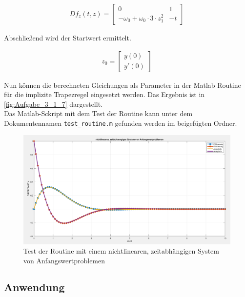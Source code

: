 \documentclass[
	pagesize,
	fontsize=12pt,
	paper=a4,
	oneside,
   reqno
]{scrartcl}
\begin{document}
\begin{align*}
   Df_z(t,z) =
   \begin{bmatrix*}
      0                                            & 1 \\
      -\omega _0 + \omega _0 \cdot 3 \cdot z_1^2  & -t
   \end{bmatrix*}
\end{align*}

Abschließend wird der Startwert ermittelt.

\begin{align*}
   z_0 =
   \begin{bmatrix*}
      y(0) \\
      y'(0)
   \end{bmatrix*}
\end{align*}

Nun können die berechneten Gleichungen als Parameter in der Matlab Routine für die implizite Trapezregel eingesetzt werden. Das Ergebnis ist in \autoref{fig:Aufgabe_3_1_7} dargestellt. \\

Das Matlab-Sckript mit dem Test der Routine kann unter dem Dokumentennamen \texttt{test\_routine.m} gefunden werden im beigefügten Ordner.

\begin{figure}[H]
   \centering
   \includegraphics[width=1\textwidth]{Bilder/Aufgabe_3_1_7.png}
   \caption[Test der Routine]{Test der Routine mit einem nichtlinearen, zeitabhängigen System von Anfangswertproblemen}
   \label{fig:Aufgabe_3_1_7}
\end{figure}

\subsection{Anwendung}

\clearpage
\end{document}
